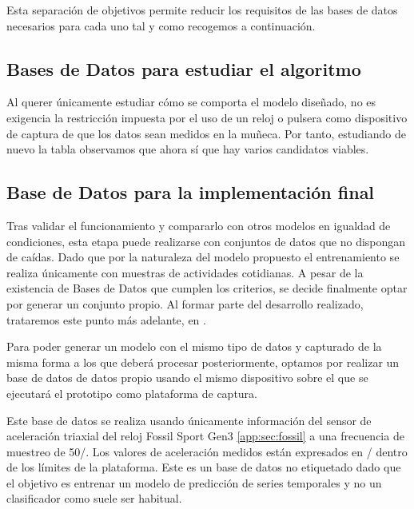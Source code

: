 Esta separación de objetivos permite reducir los requisitos de las bases de datos necesarios para cada uno tal y como recogemos a continuación.


\subsection{Bases de Datos para estudiar el algoritmo}

Al querer únicamente estudiar cómo se comporta el modelo diseñado, no es exigencia la restricción impuesta por el uso de un reloj o pulsera como dispositivo de captura de que los datos sean medidos en la muñeca. Por tanto, estudiando de nuevo la tabla  observamos que ahora sí que hay varios candidatos viables.


\subsection{Base de Datos para la implementación final}

Tras validar el funcionamiento y compararlo con otros modelos en igualdad de condiciones, esta etapa puede realizarse con conjuntos de datos que no dispongan de caídas. Dado que por la naturaleza del modelo propuesto el entrenamiento se realiza únicamente con muestras de actividades cotidianas. A pesar de la existencia de Bases de Datos que cumplen los criterios, se decide finalmente optar por generar un conjunto propio. Al formar parte del desarrollo realizado, trataremos este punto más adelante, en .




Para poder generar un modelo con el mismo tipo de datos y capturado de la misma forma a los que deberá procesar posteriormente, optamos por realizar un base de datos de datos propio usando el mismo dispositivo sobre el que se ejecutará el prototipo como plataforma de captura.

Este base de datos se realiza usando únicamente información del sensor de aceleración triaxial del reloj Fossil Sport Gen3 \ref{app:sec:fossil} a una frecuencia de muestreo de 50\hz/. Los valores de aceleración medidos están expresados en / dentro de los límites de la plataforma. Este es un base de datos no etiquetado dado que el objetivo es entrenar un modelo de predicción de series temporales y no un clasificador como suele ser habitual.

